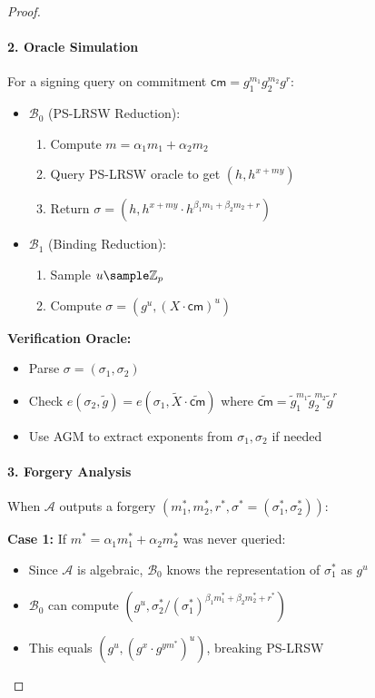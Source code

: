 \begin{proof}
\paragraph{2. Oracle Simulation}
For a signing query on commitment $\mathsf{cm} = g_1^{m_1}g_2^{m_2}g^r$:
\begin{itemize}
    \item $\mathcal{B}_0$ (PS-LRSW Reduction):
    \begin{enumerate}
        \item Compute $m = \alpha_1m_1 + \alpha_2m_2$ 
        \item Query PS-LRSW oracle to get $(h, h^{x+my})$
        \item Return $\sigma = (h, h^{x+my} \cdot h^{\beta_1m_1 + \beta_2m_2 + r})$
    \end{enumerate}
    
    \item $\mathcal{B}_1$ (Binding Reduction):
    \begin{enumerate}
        \item Sample $u \sample \Z_p$
        \item Compute $\sigma = (g^u, (X \cdot \mathsf{cm})^u)$
    \end{enumerate}
\end{itemize}

\noindent \textbf{Verification Oracle:}

\begin{itemize}
    \item Parse $\sigma = (\sigma_1, \sigma_2)$
    \item Check $e(\sigma_2, \tilde{g}) = e(\sigma_1, \tilde{X} \cdot \widetilde{\mathsf{cm}})$ where $\widetilde{\mathsf{cm}} = \tilde{g}_1^{m_1}\tilde{g}_2^{m_2}\tilde{g}^r$
    \item Use AGM to extract exponents from $\sigma_1, \sigma_2$ if needed
\end{itemize}

\paragraph{3. Forgery Analysis}
When $\mathcal{A}$ outputs a forgery $(m_1^*, m_2^*, r^*, \sigma^* = (\sigma_1^*, \sigma_2^*))$:

\textbf{Case 1:} If $m^* = \alpha_1m_1^* + \alpha_2m_2^*$ was never queried:
\begin{itemize}
    \item Since $\mathcal{A}$ is algebraic, $\mathcal{B}_0$ knows the representation of $\sigma_1^*$ as $g^u$
    \item $\mathcal{B}_0$ can compute $(g^u, \sigma_2^* / (\sigma_1^*)^{\beta_1m_1^* + \beta_2m_2^* + r^*})$
    \item This equals $(g^u, (g^x \cdot g^{ym^*})^u)$, breaking PS-LRSW
\end{itemize}


\end{proof}
